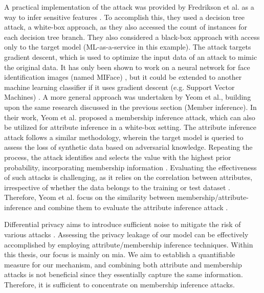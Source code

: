 A practical implementation of the attack was provided by Fredrikson et al. as a way to infer sensitive features \citep{fredrikson_model_2015}.
To accomplish this, they used a decision tree attack, a white-box approach, as they also accessed the count of instances for each decision tree branch.
They also considered a black-box approach with access only to the target model (ML-as-a-service in this example).
The attack targets gradient descent, which is used to optimize the input data of an attack to mimic the original data.
It has only been shown to work on a neural network for face identification images (named MIFace) \citep{fredrikson_model_2015}, but it could be extended to another machine learning classifier if it uses gradient descent (e.g. Support Vector Machines) \citep{nicolae_adversarial_2019}.
A more general approach was undertaken by Yeom et al., building upon the same research discussed in the previous section (Member inference).
In their work, Yeom et al. proposed a membership inference attack, which can also be utilized for attribute inference in a white-box setting.
The attribute inference attack follows a similar methodology, wherein the target model is queried to assess the loss of synthetic data based on adversarial knowledge.
Repeating the process, the attack identifies and selects the value with the highest prior probability, incorporating membership information \citep{yeom_privacy_2018,jayaraman_are_2022}.
Evaluating the effectiveness of such attacks is challenging, as it relies on the correlation between attributes, irrespective of whether the data belongs to the training or test dataset \citep{zhao_feasibility_2021}.
Therefore, Yeom et al. focus on the similarity between membership/attribute- inference and combine them to evaluate the attribute inference attack \citep{yeom_privacy_2018}. \newline

Differential privacy aims to introduce sufficient noise to mitigate the risk of various attacks \citep{dwork_exposed_2017,jayaraman_evaluating_nodate}.
Assessing the privacy leakage of our model can be effectively accomplished by employing attribute/membership inference techniques.
Within this thesis, our focus is mainly on \gls{mia}.
We aim to establish a quantifiable measure for our mechanism, and combining both attribute and membership attacks is not beneficial since they essentially capture the same information.
Therefore, it is sufficient to concentrate on membership inference attacks. %
\newpage

